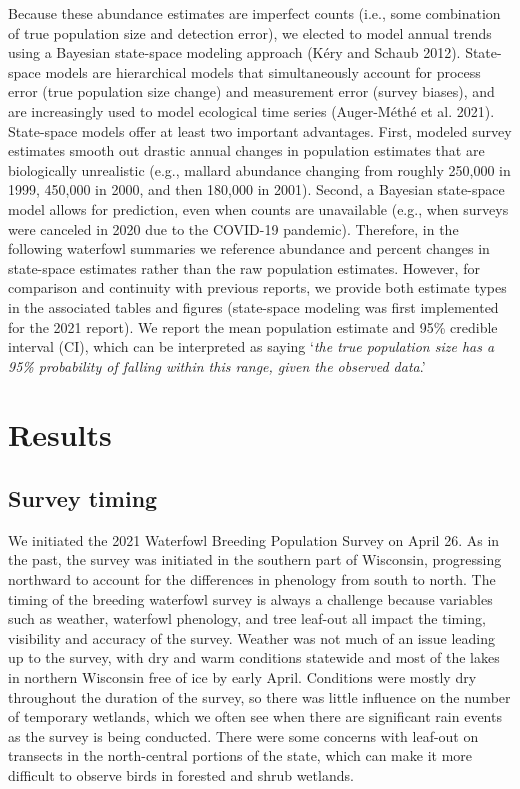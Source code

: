 \documentclass[
  12pt,
]{article}
\begin{document}
Because these abundance estimates are imperfect counts (i.e., some
combination of true population size and detection error), we elected to
model annual trends using a Bayesian state-space modeling approach (Kéry
and Schaub 2012). State-space models are hierarchical models that
simultaneously account for process error (true population size change)
and measurement error (survey biases), and are increasingly used to
model ecological time series (Auger-Méthé et al. 2021). State-space
models offer at least two important advantages. First, modeled survey
estimates smooth out drastic annual changes in population estimates that
are biologically unrealistic (e.g., mallard abundance changing from
roughly 250,000 in 1999, 450,000 in 2000, and then 180,000 in 2001).
Second, a Bayesian state-space model allows for prediction, even when
counts are unavailable (e.g., when surveys were canceled in 2020 due to
the COVID-19 pandemic). Therefore, in the following waterfowl summaries
we reference abundance and percent changes in state-space estimates
rather than the raw population estimates. However, for comparison and
continuity with previous reports, we provide both estimate types in the
associated tables and figures (state-space modeling was first
implemented for the 2021 report). We report the mean population estimate
and 95\% credible interval (CI), which can be interpreted as saying
`\emph{the true population size has a 95\% probability of falling within
this range, given the observed data}.'

\hypertarget{results}{%
\section{Results}\label{results}}

\hypertarget{survey-timing}{%
\subsection{Survey timing}\label{survey-timing}}

We initiated the 2021 Waterfowl Breeding Population Survey on April 26.
As in the past, the survey was initiated in the southern part of
Wisconsin, progressing northward to account for the differences in
phenology from south to north. The timing of the breeding waterfowl
survey is always a challenge because variables such as weather,
waterfowl phenology, and tree leaf-out all impact the timing, visibility
and accuracy of the survey. Weather was not much of an issue leading up
to the survey, with dry and warm conditions statewide and most of the
lakes in northern Wisconsin free of ice by early April. Conditions were
mostly dry throughout the duration of the survey, so there was little
influence on the number of temporary wetlands, which we often see when
there are significant rain events as the survey is being conducted.
There were some concerns with leaf-out on transects in the north-central
portions of the state, which can make it more difficult to observe birds
in forested and shrub wetlands.
\end{document}
